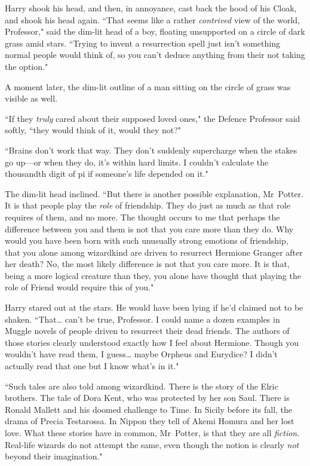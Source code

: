 Harry shook his head, and then, in annoyance, cast back the hood of his Cloak, and shook his head again. ``That seems like a rather \emph{contrived} view of the world, Professor," said the dim-lit head of a boy, floating unsupported on a circle of dark grass amid stars. ``Trying to invent a resurrection spell just isn't something normal people would think of, so you can't deduce anything from their not taking the option."

A moment later, the dim-lit outline of a man sitting on the circle of grass was visible as well.

``If they \emph{truly} cared about their supposed loved ones," the Defence Professor said softly, ``they would think of it, would they not?"

``Brains don't work that way. They don't suddenly supercharge when the stakes go up—or when they do, it's within hard limits. I couldn't calculate the thousandth digit of pi if someone's life depended on it."

The dim-lit head inclined. ``But there is another possible explanation, Mr~Potter. It is that people play the \emph{role} of friendship. They do just as much as that role requires of them, and no more. The thought occurs to me that perhaps the difference between you and them is not that you care more than they do. Why would you have been born with such unusually strong emotions of friendship, that you alone among wizardkind are driven to resurrect Hermione Granger after her death? No, the most likely difference is not that you care more. It is that, being a more logical creature than they, you alone have thought that playing the role of Friend would require this of you."

Harry stared out at the stars. He would have been lying if he'd claimed not to be shaken. ``That{\ldots} can't be true, Professor. I could name a dozen examples in Muggle novels of people driven to resurrect their dead friends. The authors of those stories clearly understood exactly how I feel about Hermione. Though you wouldn't have read them, I guess{\ldots} maybe Orpheus and Eurydice? I didn't actually read that one but I know what's in it."

``Such tales are also told among wizardkind. There is the story of the Elric brothers. The tale of Dora Kent, who was protected by her son Saul. There is Ronald Mallett and his doomed challenge to Time. In Sicily before its fall, the drama of Precia Testarossa. In Nippon they tell of Akemi Homura and her lost love. What these stories have in common, Mr~Potter, is that they are all \emph{fiction}. Real-life wizards do not attempt the same, even though the notion is clearly \emph{not} beyond their imagination."

